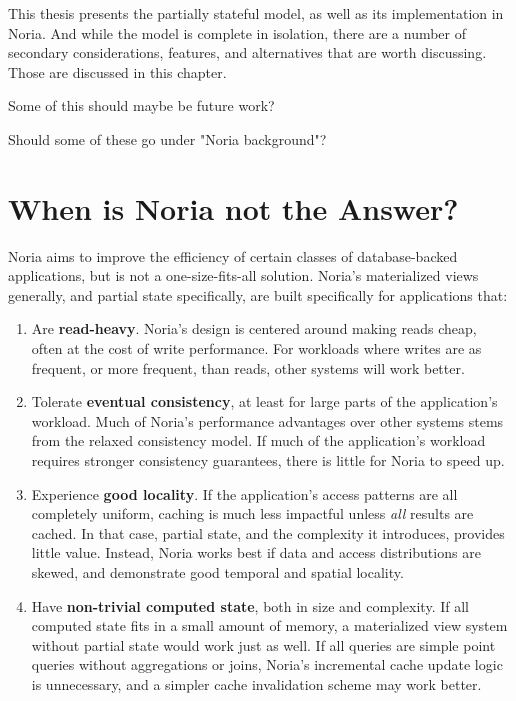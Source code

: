 This thesis presents the partially stateful model, as well as its implementation
in Noria. And while the model is complete in isolation, there are a number of
secondary considerations, features, and alternatives that are worth discussing.
Those are discussed in this chapter.

\begin{inprogress}
Some of this should maybe be future work?
\end{inprogress}

\begin{inprogress}
Should some of these go under "Noria background"?
\end{inprogress}

\section{When is Noria not the Answer?}

Noria aims to improve the efficiency of certain classes of database-backed
applications, but is not a one-size-fits-all solution. Noria's materialized
views generally, and partial state specifically, are built specifically for
applications that:

\begin{enumerate}
  \item Are \textbf{read-heavy}. Noria's design is centered around making reads
    cheap, often at the cost of write performance. For workloads where writes
    are as frequent, or more frequent, than reads, other systems will work
    better.
  \item Tolerate \textbf{eventual consistency}, at least for large parts of the
    application's workload. Much of Noria's performance advantages over other
    systems stems from the relaxed consistency model. If much of the
    application's workload requires stronger consistency guarantees, there is
    little for Noria to speed up.
  \item Experience \textbf{good locality}. If the application's access patterns
    are all completely uniform, caching is much less impactful unless \emph{all}
    results are cached. In that case, partial state, and the complexity it
    introduces, provides little value. Instead, Noria works best if data and
    access distributions are skewed, and demonstrate good temporal and spatial
    locality.
  \item Have \textbf{non-trivial computed state}, both in size and complexity.
    If all computed state fits in a small amount of memory, a materialized view
    system without partial state would work just as well. If all queries are
    simple point queries without aggregations or joins, Noria's incremental
    cache update logic is unnecessary, and a simpler cache invalidation scheme
    may work better.
\end{enumerate}

